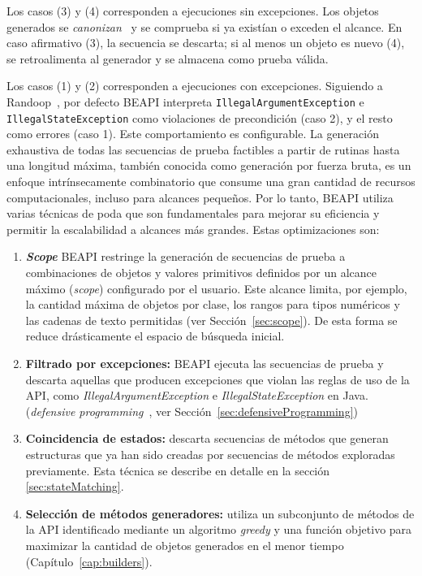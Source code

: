 Los casos (3) y (4) corresponden a ejecuciones sin excepciones.  
Los objetos generados se \emph{canonizan}~\cite{Politano20} y se comprueba 
si ya existían o exceden el alcance. En caso afirmativo (3), la secuencia se 
descarta; si al menos un objeto es nuevo (4), se retroalimenta al generador 
y se almacena como prueba válida.

Los casos (1) y (2) corresponden a ejecuciones con excepciones.  
Siguiendo a Randoop~\cite{Pacheco07}, por defecto \textsf{BEAPI} interpreta 
\texttt{IllegalArgumentException} e \texttt{IllegalStateException} como 
violaciones de precondición (caso 2), y el resto como errores (caso 1).  
Este comportamiento es configurable.
La generación exhaustiva de todas las secuencias de prueba factibles a partir de rutinas hasta una longitud máxima, 
también conocida como generación por fuerza bruta, es un enfoque intrínsecamente combinatorio que consume una gran cantidad de recursos computacionales, 
incluso para alcances pequeños. 
Por lo tanto, \textsf{BEAPI} utiliza varias técnicas de poda que son fundamentales para mejorar su eficiencia y permitir la escalabilidad a alcances más grandes.
Estas optimizaciones son:

\begin{enumerate}
    \item \textbf{\emph{Scope}} \textsf{BEAPI} restringe
      la generación de secuencias de prueba a combinaciones de objetos y valores primitivos
      definidos por un alcance máximo (\emph{scope}) configurado por el usuario. 
      Este alcance limita, por ejemplo, la cantidad máxima de objetos por clase, 
      los rangos para tipos numéricos y las cadenas de texto permitidas 
      (ver Sección~\ref{sec:scope}). De esta forma se reduce drásticamente 
      el espacio de búsqueda inicial.
    \item \textbf{Filtrado por excepciones:} \textsf{BEAPI} ejecuta las secuencias de prueba y descarta
      aquellas que producen excepciones que violan las reglas de uso de la API, como
      \emph{IllegalArgumentException} e \emph{IllegalStateException} en Java.
      (\emph{defensive programming}~\cite{Liskov00}, ver Sección~\ref{sec:defensiveProgramming})
    \item \textbf{Coincidencia de estados:} descarta secuencias de métodos que generan estructuras que ya han sido creadas por 
      secuencias de métodos exploradas previamente. Esta técnica se describe en detalle en la sección \ref{sec:stateMatching}.
    \item \textbf{Selección de métodos generadores:} utiliza un subconjunto 
      de métodos de la API identificado mediante un algoritmo \emph{greedy} y 
      una función objetivo para maximizar la cantidad de objetos generados 
      en el menor tiempo (Capítulo~\ref{cap:builders}).
\end{enumerate}

